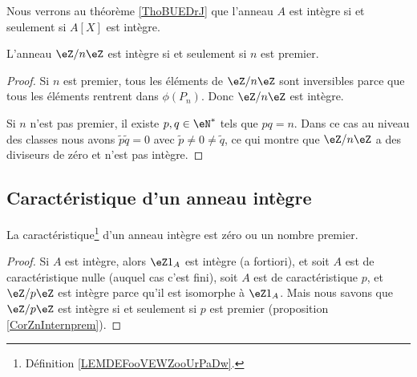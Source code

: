 Nous verrons au théorème \ref{ThoBUEDrJ} que l'anneau \( A\) est intègre si et seulement si \( A[X]\) est intègre.

\begin{corollary}   \label{CorZnInternprem}
    L'anneau \( \eZ/n\eZ\) est intègre si et seulement si \( n\) est premier.
\end{corollary}

\begin{proof}
    Si \( n\) est premier, tous les éléments de \( \eZ/n\eZ\) sont inversibles parce que tous les éléments rentrent dans \( \phi(P_n)\). Donc \( \eZ/n\eZ\) est intègre.

    Si \( n\) n'est pas premier, il existe \( p,q\in\eN^*\) tels que \( pq=n\). Dans ce cas au niveau des classes nous avons \( \tilde p\tilde q=0\) avec \( \tilde p\neq 0\neq\tilde q\), ce qui montre que \( \eZ/n\eZ\) a des diviseurs de zéro et n'est pas intègre.
\end{proof}

\subsection{Caractéristique d'un anneau intègre}

\begin{lemma}       \label{LemCaractIntergernbrcartpre}
    La caractéristique\footnote{Définition \ref{LEMDEFooVEWZooUrPaDw}.} d'un anneau intègre est zéro ou un nombre premier.
\end{lemma}

\begin{proof}
    Si \( A\) est intègre, alors \( \eZ 1_A\) est intègre (a fortiori), et soit $A$ est de caractéristique nulle (auquel cas c'est fini), soit $A$ est de caractéristique $p$, et \( \eZ/p\eZ\) est intègre parce qu'il est isomorphe à \( \eZ 1_A\). Mais nous savons que \( \eZ/p\eZ\) est intègre si et seulement si \( p\) est premier (proposition \ref{CorZnInternprem}).
\end{proof}

